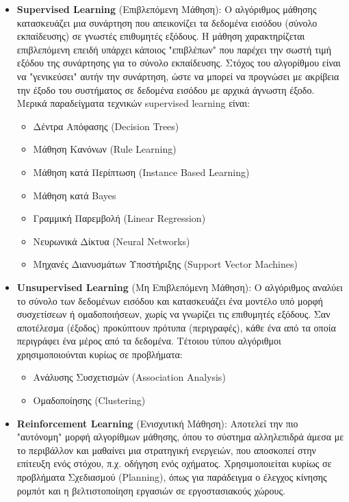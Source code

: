 \begin{itemize}
    \item \textbf{Supervised Learning} (Επιβλεπόμενη Μάθηση): Ο αλγόριθμος μάθησης κατασκευάζει μια συνάρτηση που απεικονίζει τα δεδομένα εισόδου (σύνολο εκπαίδευσης) σε γνωστές επιθυμητές εξόδους. Η μάθηση χαρακτηρίζεται επιβλεπόμενη επειδή υπάρχει κάποιος "επιβλέπων" που παρέχει την σωστή τιμή εξόδου της συνάρτησης για το σύνολο εκπαίδευσης. Στόχος του αλγορίθμου είναι να "γενικεύσει" αυτήν την συνάρτηση, ώστε να μπορεί να προγνώσει με ακρίβεια την έξοδο του συστήματος σε δεδομένα εισόδου με αρχικά άγνωστη έξοδο. Μερικά παραδείγματα τεχνικών supervised learning είναι:
    \begin{itemize}
        \item Δέντρα Απόφασης (Decision Trees)
        \item Μάθηση Κανόνων (Rule Learning)
        \item Μάθηση κατά Περίπτωση (Instance Based Learning)
        \item Μάθηση κατά Bayes
        \item Γραμμική Παρεμβολή (Linear Regression)
        \item Νευρωνικά Δίκτυα (Neural Networks)
        \item Μηχανές Διανυσμάτων Υποστήριξης (Support Vector Machines)
    \end{itemize}
    
    \item \textbf{Unsupervised Learning} (Μη Επιβλεπόμενη Μάθηση):
    Ο αλγόριθμος αναλύει το σύνολο των δεδομένων εισόδου και κατασκευάζει ένα μοντέλο υπό μορφή συσχετίσεων ή ομαδοποιήσεων, χωρίς να γνωρίζει τις επιθυμητές εξόδους. Σαν αποτέλεσμα (έξοδος) προκύπτουν πρότυπα (περιγραφές), κάθε ένα από τα οποία περιγράφει ένα μέρος από τα δεδομένα. Τέτοιου τύπου αλγόριθμοι χρησιμοποιούνται κυρίως σε προβλήματα:
    \begin{itemize}
        \item Ανάλυσης Συσχετισμών (Association Analysis)
        \item Ομαδοποίησης (Clustering)
    \end{itemize}
    
    \item \textbf{Reinforcement Learning} (Ενισχυτική Μάθηση):
    Αποτελεί την πιο "αυτόνομη" μορφή αλγορίθμων μάθησης, όπου το σύστημα αλληλεπιδρά άμεσα με το περιβάλλον και μαθαίνει μια στρατηγική ενεργειών, που αποσκοπεί στην επίτευξη ενός στόχου, π.χ. οδήγηση ενός οχήματος. Χρησιμοποιείται κυρίως σε προβλήματα Σχεδιασμού (Planning), όπως για παράδειγμα ο έλεγχος κίνησης ρομπότ και η βελτιστοποίηση εργασιών σε εργοστασιακούς χώρους.
\end{itemize}

